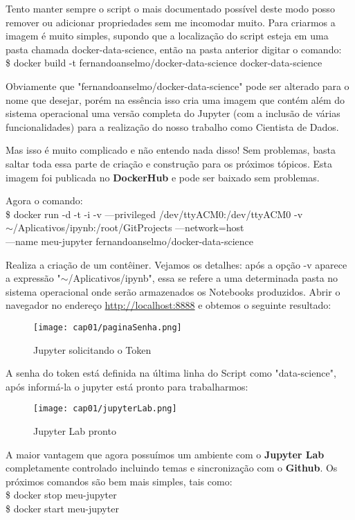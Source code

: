Tento manter sempre o script o mais documentado possível deste modo posso remover ou adicionar propriedades sem me incomodar muito. Para criarmos a imagem é muito simples, supondo que a localização do script esteja em uma pasta chamada docker-data-science, então na pasta anterior digitar o comando: \\
{\ttfamily\$ docker build -t fernandoanselmo/docker-data-science docker-data-science}

Obviamente que "fernandoanselmo/docker-data-science" pode ser alterado para o nome que desejar, porém na essência isso cria uma imagem que contém além do sistema operacional uma versão completa do Jupyter (com a inclusão de várias funcionalidades) para a realização do nosso trabalho como Cientista de Dados. 

\begin{note}[Socorro]{}
	Mas isso é muito complicado e não entendo nada disso! Sem problemas, basta saltar toda essa parte de criação e construção para os próximos tópicos. Esta imagem foi publicada no \textbf{DockerHub} e pode ser baixado sem problemas.
\end{note}

Agora o comando: \\
{\ttfamily\$ docker run -d -t -i -v ---privileged /dev/ttyACM0:/dev/ttyACM0 -v \\ $\sim$/Aplicativos/ipynb:/root/GitProjects ---network=host \\
	 ---name meu-jupyter fernandoanselmo/docker-data-science}
 
Realiza a criação de um contêiner. Vejamos os detalhes: após a opção -v aparece a expressão "$\sim$/Aplicativos/ipynb", essa se refere a uma determinada pasta no sistema operacional onde serão armazenados os Notebooks produzidos. Abrir o navegador no endereço \url{http://localhost:8888} e obtemos o seguinte resultado:
\begin{figure}[H]
	\centering\texttt{[image: cap01/paginaSenha.png]}
	\caption{Jupyter solicitando o Token}
\end{figure}

A senha do token está definida na última linha do Script como "data-science", após informá-la o jupyter está pronto para trabalharmos:
\begin{figure}[H]
	\centering\texttt{[image: cap01/jupyterLab.png]}
	\caption{Jupyter Lab pronto}
\end{figure}

A maior vantagem que agora possuímos um ambiente com o \textbf{Jupyter Lab} completamente controlado incluindo temas e sincronização com o \textbf{Github}. Os próximos comandos são bem mais simples, tais como: \\
{\ttfamily\$ docker stop meu-jupyter} \\
{\ttfamily\$ docker start meu-jupyter}

